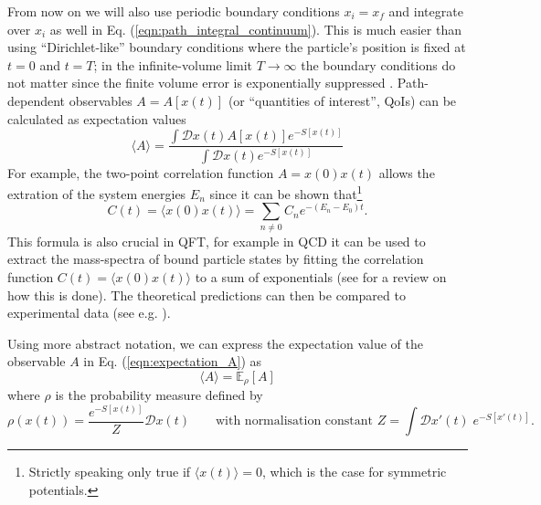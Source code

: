 \documentclass[11pt]{article}
\begin{document}
From now on we will also use periodic boundary conditions $x_i=x_f$ and integrate over $x_i$ as well in Eq. (\ref{eqn:path_integral_continuum}). This is much easier than using ``Dirichlet-like'' boundary conditions where the particle's position is fixed at $t=0$ and $t=T$; in the infinite-volume limit $T\rightarrow \infty$ the boundary conditions do not matter since the finite volume error is exponentially suppressed \cite{Lepage1994}.
Path-dependent observables $A=A[x(t)]$ (or ``quantities of interest'', QoIs) can be calculated as expectation values
\begin{equation}
  \langle A \rangle = \frac{\int \mathcal{D}x(t) A[x(t)] e^{-S[x(t)]}}{\int \mathcal{D}x(t) e^{-S[x(t)]}}\label{eqn:expectation_A}
\end{equation}
For example, the two-point correlation function $A=x(0)x(t)$ allows the extration of the system energies $E_n$ since it can be shown that\footnote{Strictly speaking only true if $\langle x(t)\rangle=0$, which is the case for symmetric potentials.}
\begin{equation}
  C(t) = \langle x(0) x(t) \rangle = \sum_{n\ne 0} C_n e^{-(E_n-E_0)t}.\label{eqn:spectrum}
\end{equation}
This formula is also crucial in QFT, for example in QCD it can be used to extract the mass-spectra of bound particle states by fitting the correlation function $C(t) = \langle x(0)x(t)\rangle$ to a sum of exponentials (see \cite{Fodor2012} for a review on how this is done). The theoretical predictions can then be compared to experimental data (see e.g. \cite{Davies2004}).

Using more abstract notation, we can express the expectation value of the observable $A$ in Eq. (\ref{eqn:expectation_A}) as
\begin{equation}
   \langle A \rangle = \mathbb{E}_{\rho}\left[A\right]
\end{equation}
where $\rho$ is the probability measure defined by
\begin{equation}
  \rho(x(t)) = \frac{e^{-S[x(t)]}}{Z}\mathcal{D}x(t)\qquad\text{with normalisation constant $Z = \int \mathcal{D}x'(t)\; e^{-S[x'(t)]}$}. \label{eqn:measure_continuum}
\end{equation}
\end{document}
